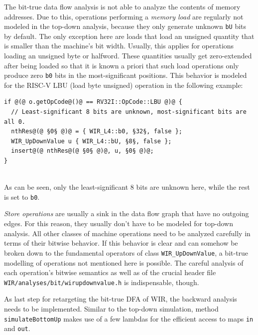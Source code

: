 \begin{enumerate}[resume]
  The bit-true data flow analysis is not able to analyze the contents of memory addresses.
  Due to this, operations performing a \emph{memory load} are regularly not modeled in the top-down analysis, because they only generate unknown \texttt{bU} bits by default.
  The only exception here are loads that load an unsigned quantity that is smaller than the machine's bit width.
  Usually, this applies for operations loading an unsigned byte or halfword.
  These quantities usually get zero-extended after being loaded so that it is known a priori that such load operations only produce zero \texttt{b0} bits in the most-significant positions.
  This behavior is modeled for the RISC-V LBU (load byte unsigned) operation in the following example: \\
\begin{lstlisting}[style=code,float=!h,xleftmargin=10mm,aboveskip=-0.8 \baselineskip,belowskip=-0.8 \baselineskip]
if @(@ o.getOpCode@()@ == RV32I::OpCode::LBU @)@ {
  // Least-significant 8 bits are unknown, most-significant bits are all 0.
  nthRes@(@ §0§ @)@ = { WIR_L4::b0, §32§, false };
  WIR_UpDownValue u { WIR_L4::bU, §8§, false };
  insert@(@ nthRes@(@ §0§ @)@, u, §0§ @)@;
}
\end{lstlisting}
  \\
  As can be seen, only the least-significant 8 bits are unknown here, while the rest is set to \texttt{b0}.

  \emph{Store operations} are usually a sink in the data flow graph that have no outgoing edges.
  For this reason, they usually don't have to be modeled for top-down analysis.
  All other classes of machine operations need to be analyzed carefully in terms of their bitwise behavior.
  If this behavior is clear and can somehow be broken down to the fundamental operators of class \texttt{WIR\_UpDownValue}, a bit-true modelling of operations not mentioned here is possible.
  The careful analysis of each operation's bitwise semantics as well as of the crucial header file \texttt{WIR/analyses/bit/wirupdownvalue.h} is indispensable, though.
\end{enumerate}

As last step for retargeting the bit-true \gls{DFA} of \gls{WIR}, the backward analysis needs to be implemented.
Similar to the top-down simulation, method \texttt{simulateBottomUp} makes use of a few lambdas for the efficient access to maps \texttt{in} and \texttt{out}.

